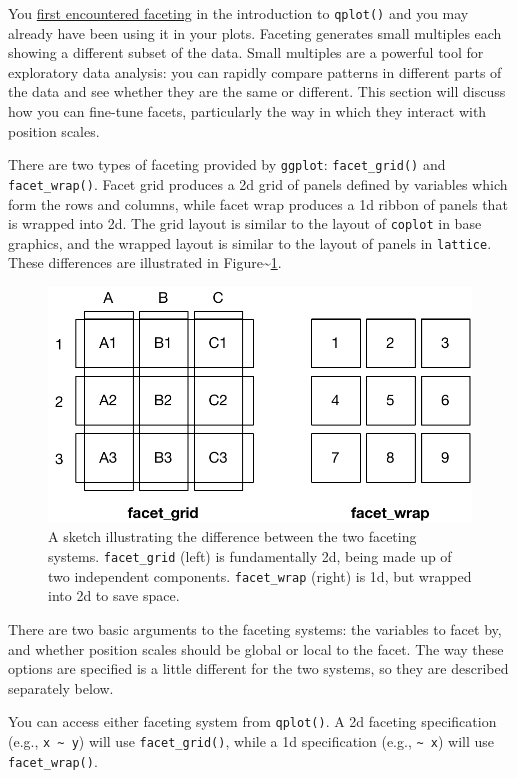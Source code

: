 You \hyperref[sec:qplot-faceting]{first encountered faceting} in the
introduction to \texttt{qplot()} and you may already have been using it
in your plots. Faceting generates small multiples each showing a
different subset of the data. Small multiples are a powerful tool for
exploratory data analysis: you can rapidly compare patterns in different
parts of the data and see whether they are the same or different. This
section will discuss how you can fine-tune facets, particularly the way
in which they interact with position scales. 

There are two types of faceting provided by \texttt{ggplot}:
\texttt{facet\_grid()} and \texttt{facet\_wrap()}. Facet grid produces a
2d grid of panels defined by variables which form the rows and columns,
while facet wrap produces a 1d ribbon of panels that is wrapped into 2d.
The grid layout is similar to the layout of \texttt{coplot} in base
graphics, and the wrapped layout is similar to the layout of panels in
\texttt{lattice}. These differences are illustrated in
Figure\textasciitilde{}\ref{fig:facet-sketch}.

\begin{figure}[htbp]
  \centering
    \includegraphics[width=0.5\linewidth]{diagrams/position-facets}
  \caption{A sketch illustrating the difference between the two faceting systems. \texttt{facet\_grid} (left) is fundamentally 2d, being made up of two independent components. \texttt{facet\_wrap} (right) is 1d, but wrapped into 2d to save space.}
  \label{fig:facet-sketch}
\end{figure}

There are two basic arguments to the faceting systems: the variables to
facet by, and whether position scales should be global or local to the
facet. The way these options are specified is a little different for the
two systems, so they are described separately below.

You can access either faceting system from \texttt{qplot()}. A 2d
faceting specification (e.g., \texttt{x \textasciitilde{} y}) will use
\texttt{facet\_grid()}, while a 1d specification (e.g.,
\texttt{\textasciitilde{} x}) will use \texttt{facet\_wrap()}.

